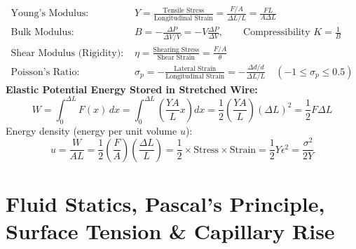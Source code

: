 \documentclass[10pt,a4paper]{article}
\begin{document}
\begin{formulabox}
\begin{align}
  \text{Young's Modulus: } &Y = \frac{\text{Tensile Stress}}{\text{Longitudinal Strain}} = \frac{F/A}{\Delta L/L} = \frac{F L}{A \Delta L} \\
  \text{Bulk Modulus: } &B = -\frac{\Delta P}{\Delta V / V} = -V\frac{\Delta P}{\Delta V}, \qquad \text{Compressibility } K = \frac{1}{B} \\
  \text{Shear Modulus (Rigidity): } &\eta = \frac{\text{Shearing Stress}}{\text{Shear Strain}} = \frac{F/A}{\theta} \\
  \text{Poisson's Ratio: } &\sigma_p = -\frac{\text{Lateral Strain}}{\text{Longitudinal Strain}} = -\frac{\Delta d/d}{\Delta L/L} \quad (-1 \le \sigma_p \le 0.5)
\end{align}
\textbf{Elastic Potential Energy Stored in Stretched Wire:}
\begin{equation}
  W = \int_0^{\Delta L} F(x)\,dx = \int_0^{\Delta L} \left(\frac{YA}{L}x\right)dx = \frac{1}{2}\left(\frac{YA}{L}\right)(\Delta L)^2 = \frac{1}{2}F\Delta L
\end{equation}
Energy density (energy per unit volume $u$):
\begin{equation}
  u = \frac{W}{A L} = \frac{1}{2}\left(\frac{F}{A}\right)\left(\frac{\Delta L}{L}\right) = \frac{1}{2}\times\text{Stress}\times\text{Strain} = \frac{1}{2}Y\epsilon^2 = \frac{\sigma^2}{2Y}
\end{equation}
\end{formulabox}

\section{Fluid Statics, Pascal's Principle, Surface Tension \& Capillary Rise}
\end{document}
